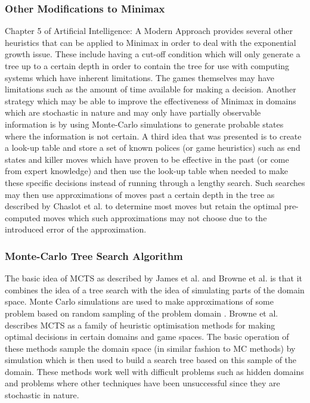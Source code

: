 \documentclass [11pt]{article}
\begin{document}
	\subsubsection{Other Modifications to Minimax}
	Chapter 5 of Artificial Intelligence: A Modern Approach \cite{AIModern} provides several other heuristics that can be applied to Minimax in order to deal with the exponential growth issue. These include having a cut-off condition which will only generate a tree up to a certain depth in order to contain the tree for use with computing systems which have inherent limitations. The games themselves may have limitations such as the amount of time available for making a decision. Another strategy which may be able to improve the effectiveness of Minimax in domains which are stochastic in nature and may only have partially observable information is by using Monte-Carlo simulations to generate probable states where the information is not certain. A third idea that was presented is to create a look-up table and store a set of known polices (or game heuristics) such as end states and killer moves which have proven to be effective in the past (or come from expert knowledge) and then use the look-up table when needed to make these specific decisions instead of running through a lengthy search. Such searches may then use approximations of moves past a certain depth in the tree as described by Chaslot et al. \cite{progressive} to determine most moves but retain the optimal pre-computed moves which such approximations may not choose due to the introduced error of the approximation.
	
	\subsubsection{Monte-Carlo Tree Search Algorithm}
	The basic idea of MCTS as described by James et al. \cite{wits} and Browne et al. \cite{survey} is that it combines the idea of a tree search with the idea of simulating parts of the domain space. Monte Carlo simulations are used to make approximations of some problem based on random sampling of the problem domain \cite{survey}. Browne et al. \cite{survey} describes MCTS as a family of heuristic optimisation methods for making optimal decisions in certain domains and game spaces. The basic operation of these methods sample the domain space (in similar fashion to MC methods) by simulation which is then used to build a search tree based on this sample of the domain. These methods work well with difficult problems such as hidden domains and problems where other techniques have been unsuccessful since they are stochastic in nature.\\
	
\end{document}
